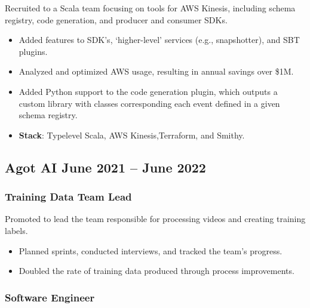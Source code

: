 \documentclass[10pt]{article} %
\providecommand{\tightlist}{%
  \setlength{\itemsep}{0pt}\setlength{\parskip}{0pt}}
\begin{document}
\begin{paracol}{2}
Recruited to a Scala team focusing on tools for AWS Kinesis, including
schema registry, code generation, and producer and consumer SDKs.

\begin{itemize}
\tightlist
\item
  Added features to SDK's, `higher-level' services (e.g., snapshotter),
  and SBT plugins.
\item
  Analyzed and optimized AWS usage, resulting in annual savings over
  \$1M.
\item
  Added Python support to the code generation plugin, which outputs a
  custom library with classes corresponding each event defined in a
  given schema registry.
\item
  \textbf{Stack}: Typelevel Scala, AWS Kinesis,Terraform, and Smithy.
\end{itemize}

\hypertarget{agot-ai-june-2021-june-2022}{%
\subsection{\texorpdfstring{Agot AI \hfill \small June 2021 -- June
2022}{Agot AI June 2021 -- June 2022}}\label{agot-ai-june-2021-june-2022}}

\vspace{-5pt}

\hypertarget{training-data-team-lead}{%
\subsubsection{\texorpdfstring{\small Training Data Team
Lead}{Training Data Team Lead}}\label{training-data-team-lead}}

Promoted to lead the team responsible for processing videos and creating
training labels.

\begin{itemize}
\tightlist
\item
  Planned sprints, conducted interviews, and tracked the team's
  progress.
\item
  Doubled the rate of training data produced through process
  improvements.
\end{itemize}

\hypertarget{software-engineer}{%
\subsubsection{\texorpdfstring{\small Software
Engineer}{Software Engineer}}\label{software-engineer}}


\end{paracol}
\end{document}
